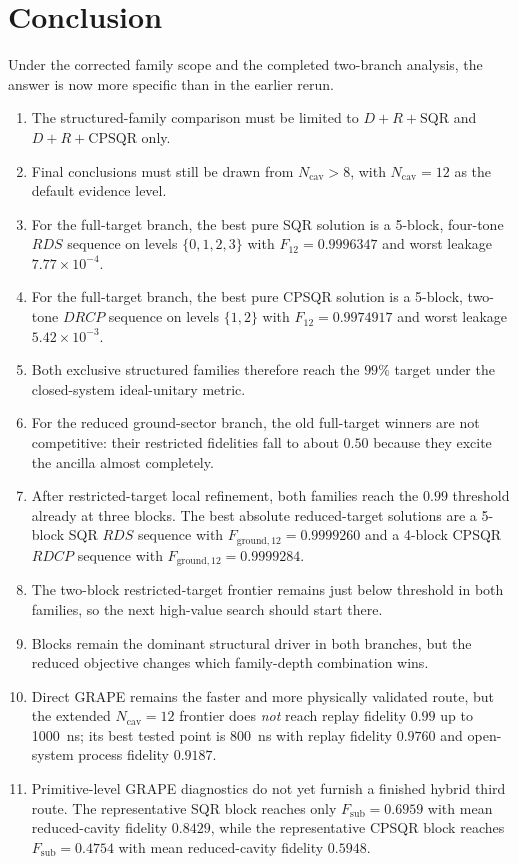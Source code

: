 ﻿\documentclass[aps,pra,twocolumn,reprint,amsmath,amssymb,floatfix]{revtex4-2}
\begin{document}
\section{Conclusion}

Under the corrected family scope and the completed two-branch analysis, the
answer is now more specific than in the earlier rerun.

\begin{enumerate}
  \item The structured-family comparison must be limited to
  $D+R+\mathrm{SQR}$ and $D+R+\mathrm{CPSQR}$ only.
  \item Final conclusions must still be drawn from $N_{\mathrm{cav}}>8$, with
  $N_{\mathrm{cav}}=12$ as the default evidence level.
  \item For the full-target branch, the best pure SQR solution is a 5-block,
  four-tone $RDS$ sequence on
  levels $\{0,1,2,3\}$ with
  $F_{12}=0.9996347$ and worst leakage $7.77\times10^{-4}$.
  \item For the full-target branch, the best pure CPSQR solution is a 5-block,
  two-tone $DRCP$ sequence on
  levels $\{1,2\}$ with
  $F_{12}=0.9974917$ and worst leakage $5.42\times10^{-3}$.
  \item Both exclusive structured families therefore reach the $99\%$ target
  under the closed-system ideal-unitary metric.
  \item For the reduced ground-sector branch, the old full-target winners are
  not competitive: their restricted fidelities fall to about $0.50$ because
  they excite the ancilla almost completely.
  \item After restricted-target local refinement, both families reach the
  $0.99$ threshold already at three blocks. The best absolute reduced-target
  solutions are a 5-block SQR $RDS$ sequence with
  $F_{\mathrm{ground},12}=0.9999260$ and a 4-block CPSQR $RDCP$ sequence with
  $F_{\mathrm{ground},12}=0.9999284$.
  \item The two-block restricted-target frontier remains just below threshold
  in both families, so the next high-value search should start there.
  \item Blocks remain the dominant structural driver in both branches, but the
  reduced objective changes which family-depth combination wins.
  \item Direct GRAPE remains the faster and more physically validated route,
  but the extended $N_{\mathrm{cav}}=12$ frontier does \emph{not} reach replay
  fidelity $0.99$ up to \SI{1000}{ns}; its best tested point is
  \SI{800}{ns} with replay fidelity $0.9760$ and open-system process fidelity
  $0.9187$.
  \item Primitive-level GRAPE diagnostics do not yet furnish a finished hybrid
  third route. The representative SQR block reaches only
  $F_{\mathrm{sub}}=0.6959$ with mean reduced-cavity fidelity $0.8429$, while
  the representative CPSQR block reaches $F_{\mathrm{sub}}=0.4754$ with mean
  reduced-cavity fidelity $0.5948$.
\end{enumerate}
\end{document}
